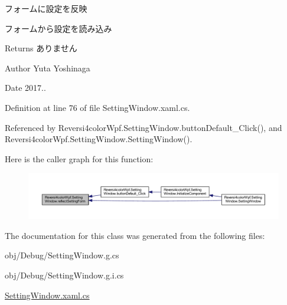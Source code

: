 フォームに設定を反映 

フォームから設定を読み込み

\begin{DoxyReturn}{Returns}
ありません 
\end{DoxyReturn}
\begin{DoxyAuthor}{Author}
Yuta Yoshinaga 
\end{DoxyAuthor}
\begin{DoxyDate}{Date}
2017.. 
\end{DoxyDate}


Definition at line 76 of file Setting\+Window.\+xaml.\+cs.



Referenced by Reversi4color\+Wpf.\+Setting\+Window.\+button\+Default\+\_\+\+Click(), and Reversi4color\+Wpf.\+Setting\+Window.\+Setting\+Window().



Here is the caller graph for this function\+:
\nopagebreak
\begin{figure}[H]
\begin{center}
\leavevmode
\includegraphics[width=350pt]{class_reversi4color_wpf_1_1_setting_window_a768840bbf4baf723e039d187a7ee3def_icgraph}
\end{center}
\end{figure}




The documentation for this class was generated from the following files\+:\begin{DoxyCompactItemize}
\item 
obj/\+Debug/Setting\+Window.\+g.\+cs\item 
obj/\+Debug/Setting\+Window.\+g.\+i.\+cs\item 
\hyperlink{_setting_window_8xaml_8cs}{Setting\+Window.\+xaml.\+cs}\end{DoxyCompactItemize}
